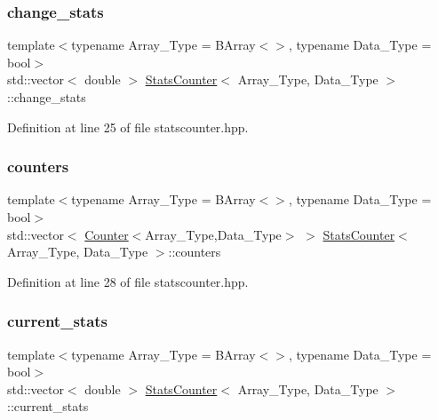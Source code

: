 \subsubsection{\texorpdfstring{change\+\_\+stats}{change\_stats}}
{\footnotesize\ttfamily template$<$typename Array\+\_\+\+Type  = B\+Array$<$$>$, typename Data\+\_\+\+Type  = bool$>$ \\
std\+::vector$<$ double $>$ \hyperlink{class_stats_counter}{Stats\+Counter}$<$ Array\+\_\+\+Type, Data\+\_\+\+Type $>$\+::change\+\_\+stats}



Definition at line 25 of file statscounter.\+hpp.

\mbox{\label{class_stats_counter_a733af6010857d84c74853be3d61610cf}} 
\subsubsection{\texorpdfstring{counters}{counters}}
{\footnotesize\ttfamily template$<$typename Array\+\_\+\+Type  = B\+Array$<$$>$, typename Data\+\_\+\+Type  = bool$>$ \\
std\+::vector$<$ \hyperlink{class_counter}{Counter}$<$Array\+\_\+\+Type,Data\+\_\+\+Type$>$ $>$ \hyperlink{class_stats_counter}{Stats\+Counter}$<$ Array\+\_\+\+Type, Data\+\_\+\+Type $>$\+::counters}



Definition at line 28 of file statscounter.\+hpp.

\mbox{\label{class_stats_counter_af98192f893280a2681a59f4b73051ca3}} 
\subsubsection{\texorpdfstring{current\+\_\+stats}{current\_stats}}
{\footnotesize\ttfamily template$<$typename Array\+\_\+\+Type  = B\+Array$<$$>$, typename Data\+\_\+\+Type  = bool$>$ \\
std\+::vector$<$ double $>$ \hyperlink{class_stats_counter}{Stats\+Counter}$<$ Array\+\_\+\+Type, Data\+\_\+\+Type $>$\+::current\+\_\+stats}



